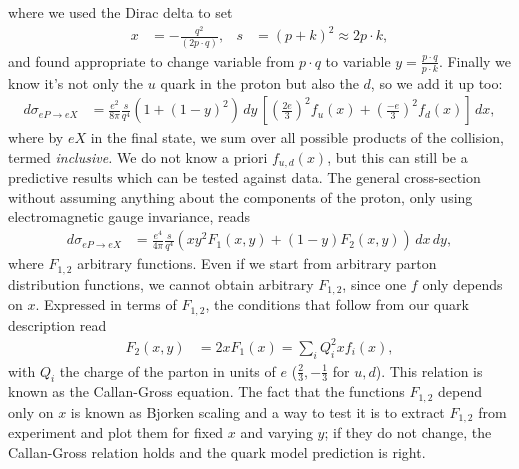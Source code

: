 \documentclass[a4paper, 11pt, normalem]{report}
\begin{document}
where we used the Dirac delta to set
\begin{align}
    x &= -\frac{q^2}{(2p\cdot q)}, & s &= (p+k)^2\approx 2p\cdot k,
\end{align}
and found appropriate to change variable from $p\cdot q$ to variable $y=\frac{p\cdot q}{p\cdot k}$.
Finally we know it's not only the $u$ quark in the proton but also the $d$, so we add it up too:
\begin{align}
    d\sigma_{eP\to eX} &= \frac{e^2}{8\pi}\frac{s}{q^4}\left(1+(1-y)^2\right)\,dy\,\left[\left(\frac{2e}{3}\right)^2f_u(x) + \left(\frac{-e}{3}\right)^2f_d(x)\right]\,dx,
\end{align}
where by $eX$ in the final state, we sum over all possible products of the collision, termed \emph{inclusive.}
We do not know a priori $f_{u,d}(x)$, but this can still be a predictive results which can be tested against data.
The general cross-section without assuming anything about the components of the proton, only using electromagnetic gauge invariance, reads
\begin{align}
    d\sigma_{eP\to eX} &= \frac{e^4}{4\pi}\frac{s}{q^4}\left(xy^2F_1(x,y) + (1-y)F_2(x,y)\right)\,dx\,dy,
\end{align}
where $F_{1,2}$ arbitrary functions.
Even if we start from arbitrary parton distribution functions, we cannot obtain arbitrary $F_{1,2}$, since one $f$ only depends on $x$.
Expressed in terms of $F_{1,2}$, the conditions that follow from our quark description read
\begin{align}
    F_2(x,y) &= 2xF_1(x) = \sum_i Q_i^2 xf_i(x),
\end{align}
with $Q_i$ the charge of the parton in units of $e$ ($\frac23,-\frac13$ for $u,d$).
This relation is known as the Callan-Gross equation.
The fact that the functions $F_{1,2}$ depend only on $x$ is known as Bjorken scaling and a way to test it is to extract $F_{1,2}$ from experiment and plot them for fixed $x$ and varying $y$; if they do not change, the Callan-Gross relation holds and the quark model prediction is right.
\end{document}
